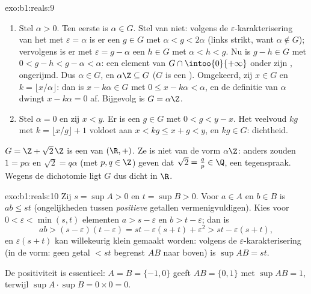 \begin{solution}{exo:b1:reals:9}
\begin{enumerate}
  \item Stel $\alpha > 0$. Ten eerste is $\alpha \in G$. Stel van niet:
        volgens de $\varepsilon$-karakterisering van het  met
        $\varepsilon = \alpha$ is er een $g \in G$ met $\alpha < g <
        2\alpha$ (links strikt, want $\alpha \notin G$); vervolgens is
        er met $\varepsilon = g - \alpha$ een $h \in G$ met $\alpha < h
        < g$. Nu is $g - h \in G$ met $0 < g - h < g - \alpha < \alpha$:
        een element van $G \cap \intoo{0}{+\infty}$ onder zijn ,
        ongerijmd. Dus $\alpha \in G$, en $\alpha\Z \subseteq G$ ($G$ is
        een ). Omgekeerd, zij $x \in G$ en $k = \lfloor x/\alpha
        \rfloor$: dan is $x - k\alpha \in G$ met $0 \leq x - k\alpha <
        \alpha$, en de definitie van $\alpha$ dwingt $x - k\alpha = 0$
        af. Bijgevolg is $G = \alpha\Z$.
  \item Stel $\alpha = 0$ en zij $x < y$. Er is een $g \in G$ met $0 < g
        < y - x$. Het veelvoud $kg$ met $k = \lfloor x/g \rfloor + 1$
        voldoet aan $x < kg \leq x + g < y$, en $kg \in G$: dichtheid.
\end{enumerate}
$G = \Z + \sqrt 2\,\Z$ is een  van $(\R, +)$. Ze is niet van de
vorm $\alpha\Z$: anders zouden $1 = p\alpha$ en $\sqrt 2 = q\alpha$ (met
$p, q \in \Z$) geven dat $\sqrt 2 = \frac qp \in \Q$, een tegenspraak.
Wegens de dichotomie ligt $G$ dus dicht in $\R$.
\end{solution}

\begin{solution}{exo:b1:reals:10}
Zij $s = \sup A > 0$ en $t = \sup B > 0$. Voor $a \in A$ en $b \in B$ is
$ab \leq st$ (ongelijkheden tussen \emph{positieve} getallen
vermenigvuldigen). Kies voor $0 < \varepsilon < \min(s, t)$ elementen $a
> s - \varepsilon$ en $b > t - \varepsilon$; dan is
\[
ab > (s - \varepsilon)(t - \varepsilon)
= st - \varepsilon(s + t) + \varepsilon^2
> st - \varepsilon (s + t),
\]
en $\varepsilon(s+t)$ kan willekeurig klein gemaakt worden: volgens de
$\varepsilon$-karakterisering (in de vorm: geen getal $< st$ begrenst
$AB$ naar boven) is $\sup AB = st$.

De positiviteit is essentieel: $A = B = \{-1, 0\}$ geeft $AB = \{0, 1\}$
met $\sup AB = 1$, terwijl $\sup A \cdot \sup B = 0 \times 0 = 0$.
\end{solution}

